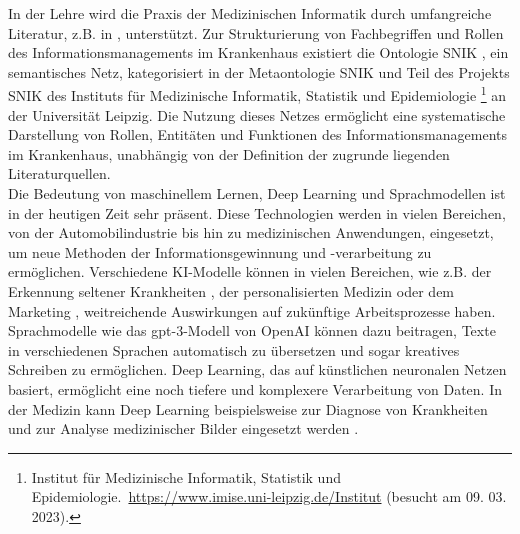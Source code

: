 In der Lehre wird die Praxis der Medizinischen Informatik durch umfangreiche Literatur, z.B. in \citet{bb}, unterstützt.
Zur Strukturierung von Fachbegriffen und Rollen des Informationsmanagements im Krankenhaus existiert die Ontologie SNIK \citep{semantischesnetz}, ein semantisches Netz, kategorisiert in der Metaontologie SNIK und Teil des Projekts SNIK des Instituts für Medizinische Informatik, Statistik und Epidemiologie%
\footnote{\raggedright{}Institut für Medizinische Informatik, Statistik und Epidemiologie.\ \url{https://www.imise.uni-leipzig.de/Institut} (besucht am 09. 03. 2023).} an der Universität Leipzig.
Die Nutzung dieses Netzes ermöglicht eine systematische Darstellung von Rollen, Entitäten und Funktionen des Informationsmanagements im Krankenhaus, unabhängig von der Definition der zugrunde liegenden Literaturquellen.\\

Die Bedeutung von maschinellem Lernen, Deep Learning und Sprachmodellen ist in der heutigen Zeit sehr präsent.
Diese Technologien werden in vielen Bereichen, von der Automobilindustrie bis hin zu medizinischen Anwendungen, eingesetzt, um neue Methoden der Informationsgewinnung und -verarbeitung zu ermöglichen.
Verschiedene KI-Modelle können in vielen Bereichen, wie z.B. der Erkennung seltener Krankheiten \citep{rare_diseases}, der personalisierten Medizin \citep{precision_med} oder dem Marketing \citep{ai_marketing}, weitreichende Auswirkungen auf zukünftige Arbeitsprozesse haben.
Sprachmodelle wie das \ac{gpt}-3-Modell von OpenAI \citep{gpt3} können dazu beitragen, Texte in verschiedenen Sprachen automatisch zu übersetzen und sogar kreatives Schreiben zu ermöglichen.
Deep Learning, das auf künstlichen neuronalen Netzen basiert, ermöglicht eine noch tiefere und komplexere Verarbeitung von Daten.
In der Medizin kann Deep Learning beispielsweise zur Diagnose von Krankheiten und zur Analyse medizinischer Bilder eingesetzt werden \citep{skincancer}.

